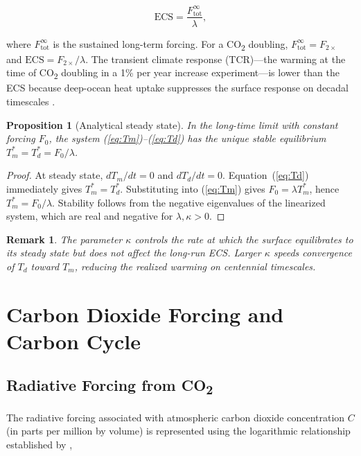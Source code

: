 \documentclass[12pt]{article}
\newtheorem{proposition}{Proposition}
\newtheorem{remark}{Remark}
\newcommand{\Ftot}{F_{\mathrm{tot}}}
\begin{document}
\begin{equation}
  \mathrm{ECS} = \frac{\Ftot^\infty}{\lambda},
  \label{eq:ECS}
\end{equation}

where $\Ftot^\infty$ is the sustained long-term forcing.  For a CO\textsubscript{2}
doubling, $\Ftot^\infty = F_{2\times}$ and $\mathrm{ECS} = F_{2\times}/\lambda$.
The transient climate response (TCR)---the warming at the time of CO\textsubscript{2}
doubling in a 1\% per year increase experiment---is lower than the ECS because
deep-ocean heat uptake suppresses the surface response on decadal timescales
\citep{Gregory2004}.

\begin{proposition}[Analytical steady state]
In the long-time limit with constant forcing $F_0$, the system
(\ref{eq:Tm})--(\ref{eq:Td}) has the unique stable equilibrium
$T_m^* = T_d^* = F_0/\lambda$.
\end{proposition}

\begin{proof}
At steady state, $dT_m/dt = 0$ and $dT_d/dt = 0$.  Equation~(\ref{eq:Td})
immediately gives $T_m^* = T_d^*$.  Substituting into (\ref{eq:Tm}) gives
$F_0 = \lambda T_m^*$, hence $T_m^* = F_0/\lambda$.  Stability follows from the
negative eigenvalues of the linearized system, which are real and negative for
$\lambda, \kappa > 0$.
\end{proof}

\begin{remark}
The parameter $\kappa$ controls the rate at which the surface equilibrates to its
steady state but does not affect the long-run ECS.  Larger $\kappa$ speeds
convergence of $T_d$ toward $T_m$, reducing the realized warming on centennial
timescales.
\end{remark}

\section{Carbon Dioxide Forcing and Carbon Cycle}
\label{sec:co2}

\subsection{Radiative Forcing from CO\texorpdfstring{\textsubscript{2}}{2}}

The radiative forcing associated with atmospheric carbon dioxide concentration
$C$ (in parts per million by volume) is represented using the logarithmic
relationship established by \citet{Myhre1998},
\end{document}
